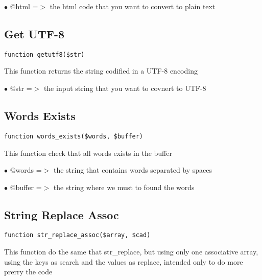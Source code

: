 \documentclass[a4paper]{book}
\begin{document}
\begin{compactitem}
\item[\color{myblue}$\bullet$] @html =$>$ the html code that you want to convert to plain text
\end{compactitem}

\hypertarget{toc278}{}
\subsection{Get UTF-8}

\begin{lstlisting}
function getutf8($str)
\end{lstlisting}

This function returns the string codified in a UTF-8 encoding

\begin{compactitem}
\item[\color{myblue}$\bullet$] @str =$>$ the input string that you want to covnert to UTF-8
\end{compactitem}

\hypertarget{toc279}{}
\subsection{Words Exists}

\begin{lstlisting}
function words_exists($words, $buffer)
\end{lstlisting}

This function check that all words exists in the buffer

\begin{compactitem}
\item[\color{myblue}$\bullet$] @words  =$>$ the string that contains words separated by spaces
\item[\color{myblue}$\bullet$] @buffer =$>$ the string where we must to found the words
\end{compactitem}

\hypertarget{toc280}{}
\subsection{String Replace Assoc}

\begin{lstlisting}
function str_replace_assoc($array, $cad)
\end{lstlisting}

This function do the same that str\_replace, but using only one associative
array, using the keys as search and the values as replace, intended only
to do more prerry the code
\end{document}
